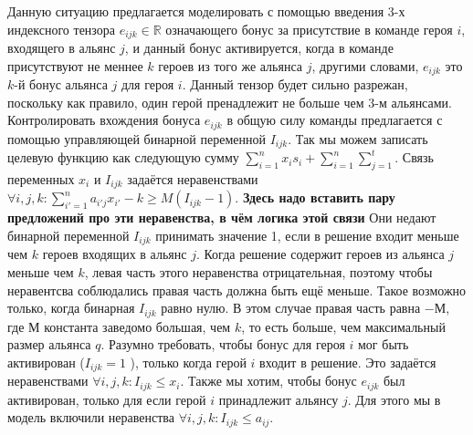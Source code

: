 \documentclass{article}
\begin{document}
Данную ситуацию предлагается моделировать с помощью введения 3-х индексного тензора $e_{ijk} \in \mathbb{R}$ означающего бонус за присутствие в команде героя $i$, входящего в альянс $j$, и данный бонус активируется, когда в команде присутствуют не меннее $k$ героев из того же альянса $j$, другими словами, $e_{ijk}$ это $k$-й бонус альянса $j$ для героя $i$. Данный тензор будет сильно разрежан, поскольку как правило, один герой пренадлежит не больше чем 3-м альянсами.  Контролировать вхождения бонуса $e_{ijk}$ в общую силу команды предлагается с помощью управляющей бинарной переменной $I_{ijk}$.
Так мы можем записать целевую функцию как следующую сумму $\sum_{i=1}^{n} x_i s_i + \sum_{i=1}^{n} \sum_{j=1}^{t} $.
Связь переменных $x_{i}$ и $I_{ijk}$ задаётся неравенствами
$\forall{i,j,k} :  \sum_{i'=1}^{n} a_{i'j} x_{i'} - k \ge M( I_{ijk}  - 1)$. \textbf{Здесь надо вставить пару предложений про эти неравенства, в чём логика этой связи}
Они недают бинарной переменной $I_{ijk}$ принимать значение 1, если в решение входит меньше чем $k$ героев входящих в альянс $j$. Когда решение содержит героев из альянса $j$ меньше чем $k$, левая часть этого неравенства отрицательная, поэтому чтобы неравентсва соблюдались правая часть должна быть ещё меньше. Такое возможно только, когда бинарная $I_{ijk}$ равно нулю. В этом случае правая часть равна $-М$, где $М$ константа заведомо большая, чем $k$, то есть больше, чем максимальный размер альянса $q$.
Разумно требовать, чтобы бонус для героя $i$ мог быть активирован ($I_{ijk} = 1$ ), только когда герой $i$ входит в решение. Это задаётся неравенствами $\forall{i,j,k} :  I_{ijk}  \le x_i$. Также мы хотим, чтобы бонус $e_{ijk}$ был активирован, только для если герой $i$ принадлежит альянсу $j$. Для этого мы в модель включили неравенства $\forall{i,j,k} :  I_{ijk}  \le a_{ij}$.   
\end{document}
